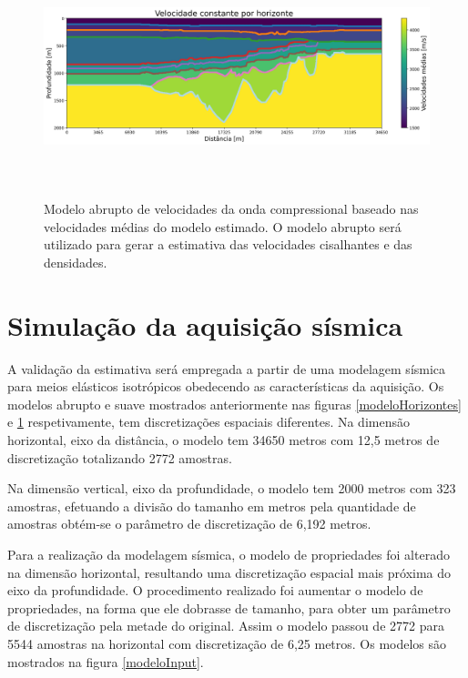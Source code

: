\documentclass[
	12pt,				%
	openright,			%
	oneside,			%
	a4paper,			%
	english,			%
	brazil				%
	]{abntex2}
\begin{document}
	\begin{figure}[htp!]
		\centering
		\includegraphics[width=16cm,height=7cm]{../imagens/modeloAbrupto.png}
		\caption{Modelo abrupto de velocidades da onda compressional baseado nas velocidades médias do modelo estimado. O modelo abrupto será utilizado para gerar a estimativa das velocidades cisalhantes e das densidades.}
		\label{modeloAbrupto}
	\end{figure}

\section{Simulação da aquisição sísmica}
	
	A validação da estimativa será empregada a partir de uma modelagem sísmica para meios elásticos isotrópicos obedecendo as características da aquisição.	Os modelos abrupto e suave mostrados anteriormente nas figuras \ref{modeloHorizontes} e \ref{modeloAbrupto} respetivamente, tem discretizações espaciais diferentes. Na dimensão horizontal, eixo da distância, o modelo tem 34650 metros com 12,5 metros de discretização totalizando 2772 amostras. 
	
	Na dimensão vertical, eixo da profundidade, o modelo tem 2000 metros com 323 amostras, efetuando a divisão do tamanho em metros pela quantidade de amostras obtém-se o parâmetro de discretização de 6,192 metros.

	Para a realização da modelagem sísmica, o modelo de propriedades foi alterado na dimensão horizontal, resultando uma discretização espacial mais próxima do eixo da profundidade. O procedimento realizado foi aumentar o modelo de propriedades, na forma que ele dobrasse de tamanho, para obter um parâmetro de discretização pela metade do original. Assim o modelo passou de 2772 para 5544 amostras na horizontal com discretização de 6,25 metros. Os modelos são mostrados na figura \ref{modeloInput}. 
	
\end{document}
